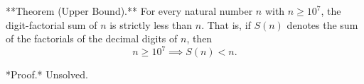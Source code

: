 
**Theorem (Upper Bound).** For every natural number $n$ with $n \geq 10^7$, the digit-factorial sum of $n$ is strictly less than $n$. That is, if $S(n)$ denotes the sum of the factorials of the decimal digits of $n$, then
$$n \geq 10^7 \implies S(n) < n.$$

*Proof.* Unsolved.